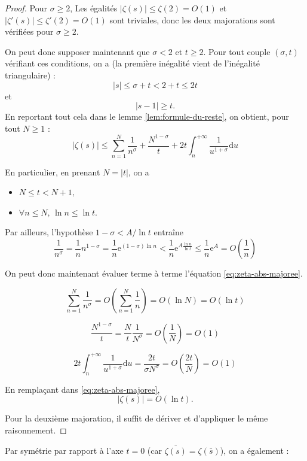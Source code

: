 \documentclass[french]{report}
\begin{document}
\begin{proof}
  Pour $\sigma\geq2$, Les égalités $|\zeta(s)|\leq\zeta(2)=O(1)$ et $|\zeta'(s)|\leq\zeta'(2)=O(1)$ sont triviales, donc les deux majorations sont vérifiées pour $\sigma\geq2$.

  On peut donc supposer maintenant que $\sigma<2$ et $t\geq2$. Pour tout couple $(\sigma, t)$ vérifiant ces conditions, on a (la première inégalité vient de l'inégalité triangulaire) :
  \[ |s|\leq\sigma+t<2+t\leq 2t \]
  et
  \[ |s-1|\geq t. \]
  En reportant tout cela dans le lemme \ref{lem:formule-du-reste}, on obtient, pour tout $N\geq1$ :
  \begin{equation}\label{eq:zeta-abs-majoree}
    |\zeta(s)|\leq\sum_{n=1}^N\frac{1}{n^\sigma}
    + \frac{N^{1-\sigma}}{t}
    + 2t\int_n^{+\infty}\frac{1}{u^{1+\sigma}}\mathrm{d}u
  \end{equation}
 
  En particulier, en prenant $N=|t|$, on a
  \begin{itemize}
    \item $N\leq t<N+1,$
    \item $\forall n\leq N,\,\ln n\leq\ln t.$
  \end{itemize}

  Par ailleurs, l'hypothèse $1-\sigma<A/\ln t$ entraîne
  \[
    \frac{1}{n^\sigma}
    = \frac{1}{n}n^{1-\sigma}
    = \frac{1}{n}\mathrm{e}^{(1-\sigma)\ln n}
    < \frac{1}{n}\mathrm{e}^{A\frac{\ln n}{\ln t}}
    \leq \frac{1}{n}\mathrm{e}^A
    = O\left(\frac{1}{n}\right)
  \]

  On peut donc maintenant évaluer terme à terme l'équation \ref{eq:zeta-abs-majoree}.

  \[
    \sum_{n=1}^N\frac{1}{n^\sigma}
    = O\left(\sum_{n=1}^N\frac{1}{n}\right)
    = O(\ln N)
    = O(\ln t)
  \]

  \[
    \frac{N^{1-\sigma}}{t}
    = \frac{N}{t}\frac{1}{N^\sigma}
    = O\left(\frac{1}{N}\right)
    = O(1)
  \]

  \[
    2t\int_n^{+\infty}\frac{1}{u^{1+\sigma}}\mathrm{d}u
    = \frac{2t}{\sigma N^\sigma}
    = O\left(\frac{2t}{N}\right)
    = O(1)
  \]

  En remplaçant dans \ref{eq:zeta-abs-majoree},
  \[ |\zeta(s)|=O(\ln t). \]

  Pour la deuxième majoration, il suffit de dériver et d'appliquer le même raisonnement.
\end{proof}

Par symétrie par rapport à l'axe $t=0$ (car $\overline{\zeta(s)}=\zeta(\bar{s})$), on a également :
\end{document}
